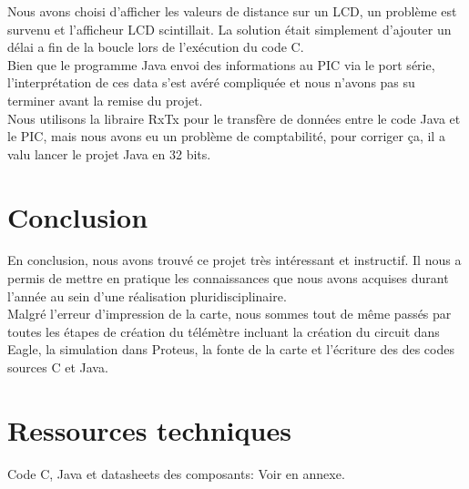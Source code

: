 \documentclass[a4paper]{article}
\begin{document}
Nous avons choisi d'afficher les valeurs de distance sur un LCD, un problème est survenu et l'afficheur LCD scintillait. La solution était simplement d'ajouter un délai a fin de la boucle lors de l'exécution du code C.  \\

Bien que le programme Java envoi des informations au PIC via le port série, l'interprétation de ces data s'est avéré compliquée et nous n'avons pas su terminer avant la remise du projet. \\

Nous utilisons la libraire RxTx pour le transfère de données entre le code Java et le PIC, mais nous avons eu un problème de comptabilité, pour corriger ça, il a valu lancer le projet Java en 32 bits. \\


\section{Conclusion}
En conclusion, nous avons trouvé ce projet très intéressant et instructif. Il nous a permis de mettre en pratique les connaissances que nous avons acquises durant l’année au sein d’une réalisation pluridisciplinaire. \\
Malgré l’erreur d’impression de la carte, nous sommes tout de même passés par toutes les étapes de création du télémètre incluant la création du circuit dans Eagle, la simulation dans Proteus, la fonte de la carte et l’écriture des des codes sources C et Java.

\section{Ressources techniques}
Code C, Java et datasheets des composants: Voir en annexe.
\end{document}
